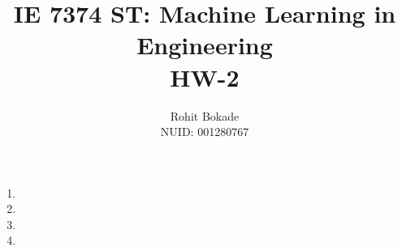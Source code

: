\documentclass[11pt]{article}
\title{IE 7374 ST: Machine Learning in Engineering \\ HW-2}
\author{Rohit Bokade \\ NUID: 001280767}
\begin{document}
	
	\maketitle 
	\begin{enumerate}
		\item 
		\item 
		\item 
		\item 	
	\end{enumerate}
\end{document}
